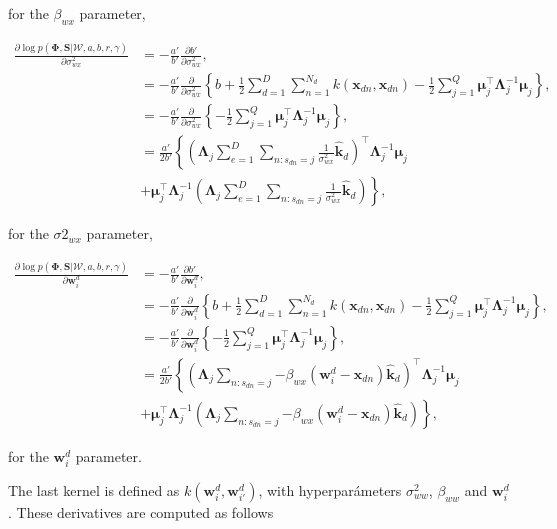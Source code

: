 \documentclass[]{article}
\newcommand{\kernel}[2]{k\left(#1,#2\right)}
\newcommand{\kernelww}[2]{k\left(\mathbf{w}_{#1}^d,\mathbf{w}_{#2}^d\right)}
\newcommand{\C}{\boldsymbol{\Lambda}_j}
\newcommand{\muJ}{\boldsymbol{\mu}_j}
\newcommand{\W}{\boldsymbol{\mathcal{W}}}
\newcommand{\indobj}{\mathbf{x}_{dn}}
\newcommand{\wIj}[1]{\mathbf{w}_{#1}^d}
\newcommand{\kawx}{\mathbf{\hat{k}}_d }
\newcommand{\likel}{\log p\left(\boldsymbol{\Phi},\mathbf{S}|\W,a,b,r,\gamma\right)}
\begin{document}
for the $\beta_{wx}$ parameter,

\begin{align}
\frac{\partial \likel}{\partial \sigma^2_{wx}} &= -\frac{a'}{b'}\frac{\partial b'}{\partial \sigma^2_{wx}}, \\
& =  -\frac{a'}{b'}\frac{\partial }{\partial \sigma^2_{wx}}\left\{b+{\frac{1}{2}}\sum\limits_{d=1}^{D}\sum\limits_{n=1}^{N_d}\kernel{\indobj}{\indobj}-{\frac{1}{2}}\sum\limits_{j=1}^{Q}\boldsymbol{\mu}_j^\top \C^{-1}\muJ\right\}, \\
& =  -\frac{a'}{b'}\frac{\partial }{\partial \sigma^2_{wx}}\left\{-{\frac{1}{2}}\sum\limits_{j=1}^{Q}\boldsymbol{\mu}_j^\top \C^{-1}\muJ\right\}, \\
& =  \frac{a'}{2b'} \left\{\left(\C\sum\limits_{e=1}^{D}{\sum\limits_{n:s_{dn}=j}\frac{1}{\sigma^2_{wx}}\kawx}\right)^\top\C^{-1}\muJ \right. \\
&\left. +   \muJ^\top\C^{-1}\left(\C\sum\limits_{e=1}^{D}{\sum\limits_{n:s_{dn}=j}\frac{1}{\sigma^2_{wx}}\kawx}\right)
\right\},
\end{align}

for the $\sigma2_{wx}$ parameter,

\begin{align}
\frac{\partial \likel}{\partial \wIj{i}} &= -\frac{a'}{b'}\frac{\partial b'}{\partial \wIj{i}}, \\
& =  -\frac{a'}{b'}\frac{\partial }{\partial \wIj{i}}\left\{b+{\frac{1}{2}}\sum\limits_{d=1}^{D}\sum\limits_{n=1}^{N_d}\kernel{\indobj}{\indobj}-{\frac{1}{2}}\sum\limits_{j=1}^{Q}\boldsymbol{\mu}_j^\top \C^{-1}\muJ\right\}, \\
& =  -\frac{a'}{b'}\frac{\partial }{\partial \wIj{i}}\left\{-{\frac{1}{2}}\sum\limits_{j=1}^{Q}\boldsymbol{\mu}_j^\top \C^{-1}\muJ\right\}, \\
& =  \frac{a'}{2b'} \left\{\left(\C\sum\limits_{n:s_{dn}=j}{-\beta_{wx}\left(\wIj{i}-\indobj\right)\kawx}\right)^\top\C^{-1}\muJ \right. \\
&\left. +   \muJ^\top\C^{-1}\left(\C\sum\limits_{n:s_{dn}=j}{-\beta_{wx}\left(\wIj{i}-\indobj\right)\kawx}\right)
\right\},
\end{align}

for the $\wIj{i}$ parameter.

The last kernel is defined as $\kernelww{i}{i'}$, with hyperparámeters $\sigma^2_{ww}$, $\beta_{ww}$ and $\wIj{i}$. These derivatives are computed as follows
\end{document}
